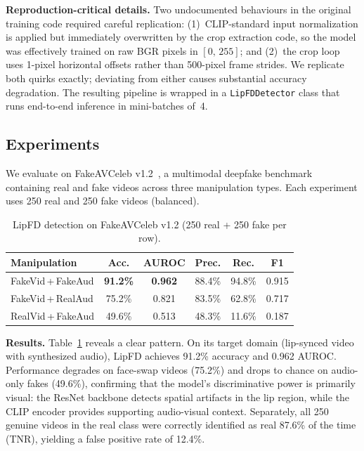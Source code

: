 \documentclass[conference]{IEEEtran}
\begin{document}
\smallskip\noindent\textbf{Reproduction-critical details.}  Two undocumented behaviours in the original training code required careful replication: (1)~CLIP-standard input normalization is applied but immediately overwritten by the crop extraction code, so the model was effectively trained on raw BGR pixels in $[0,\,255]$; and (2)~the crop loop uses 1-pixel horizontal offsets rather than 500-pixel frame strides.  We replicate both quirks exactly; deviating from either causes substantial accuracy degradation.  The resulting pipeline is wrapped in a \texttt{LipFDDetector} class that runs end-to-end inference in mini-batches of~4.

\subsection{Experiments}
We evaluate on FakeAVCeleb v1.2~\cite{fakeavceleb2021}, a multimodal deepfake benchmark containing real and fake videos across three manipulation types.  Each experiment uses 250 real and 250 fake videos (balanced).

\begin{table}[!t]
\centering
\caption{LipFD detection on FakeAVCeleb v1.2 (250 real + 250 fake per row).}
\label{tab:lipfd_results}
\begin{tabular}{lccccc}
\toprule
\textbf{Manipulation} & \textbf{Acc.} & \textbf{AUROC} & \textbf{Prec.} & \textbf{Rec.} & \textbf{F1} \\
\midrule
FakeVid\,+\,FakeAud   & \textbf{91.2\%} & \textbf{0.962} & 88.4\% & 94.8\% & 0.915 \\
FakeVid\,+\,RealAud   & 75.2\% & 0.821 & 83.5\% & 62.8\% & 0.717 \\
RealVid\,+\,FakeAud   & 49.6\% & 0.513 & 48.3\% & 11.6\% & 0.187 \\
\bottomrule
\end{tabular}
\end{table}

\noindent\textbf{Results.}  Table~\ref{tab:lipfd_results} reveals a clear pattern.  On its target domain (lip-synced video with synthesized audio), LipFD achieves 91.2\% accuracy and 0.962 AUROC.  Performance degrades on face-swap videos (75.2\%) and drops to chance on audio-only fakes (49.6\%), confirming that the model's discriminative power is primarily visual: the ResNet backbone detects spatial artifacts in the lip region, while the CLIP encoder provides supporting audio-visual context.  Separately, all 250 genuine videos in the real class were correctly identified as real 87.6\% of the time (TNR), yielding a false positive rate of 12.4\%.
\end{document}
